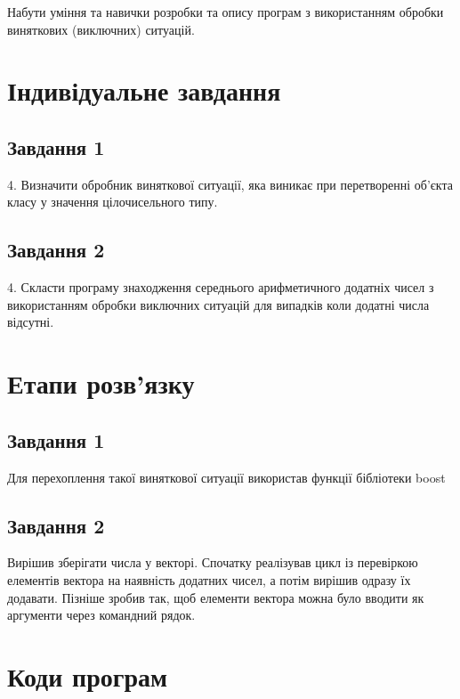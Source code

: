 \documentclass[a4paper, 12pt, oneside]{extarticle}
\begin{document}
\Margins



Набути уміння та навички розробки та опису програм з використанням
обробки виняткових (виключних) ситуацій.

\section*{Індивідуальне завдання}

\subsection*{Завдання 1}

4. Визначити обробник виняткової ситуації, яка виникає при перетворенні
об’єкта класу у значення цілочисельного типу.

\subsection*{Завдання 2}

4. Скласти програму знаходження середнього арифметичного додатніх чисел  з
використанням обробки виключних ситуацій для випадків коли додатні числа
відсутні.

\section*{Етапи розв'язку}

\subsection*{Завдання 1}

Для перехоплення такої виняткової ситуації використав
функції бібліотеки boost

\subsection*{Завдання 2}

Вирішив зберігати числа у векторі.
Спочатку реалізував цикл із перевіркою
елементів вектора на наявність додатних
чисел, а потім вирішив одразу їх додавати.
Пізніше зробив так, щоб елементи вектора можна
було вводити як аргументи через командний рядок.

\section*{Коди програм}
\end{document}
